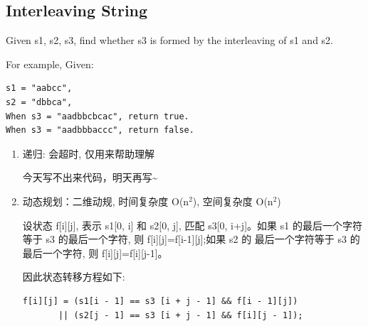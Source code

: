 \documentclass[12pt]{book}
\begin{document}
\subsection{Interleaving String}
\label{sec-14-3-7}
Given s1, s2, s3, find whether s3 is formed by the interleaving of s1 and s2.

For example, Given:
\lstset{language=java,label= ,caption= ,numbers=none}
\begin{lstlisting}
s1 = "aabcc",
s2 = "dbbca",
When s3 = "aadbbcbcac", return true.
When s3 = "aadbbbaccc", return false.
\end{lstlisting}

\begin{enumerate}
\item 递归: 会超时, 仅用来帮助理解
\label{sec-14-3-7-1}

今天写不出来代码，明天再写\textasciitilde{}~

\item 动态规划：二维动规, 时间复杂度 O(n$^{\text{2}}$), 空间复杂度 O(n$^{\text{2}}$)
\label{sec-14-3-7-2}

设状态 f[i][j], 表示 s1[0, i] 和 s2[0, j], 匹配 s3[0,  i+j]。如果 s1
的最后一个字符等于 s3 的最后一个字符, 则 f[i][j]=f[i-1][j];如果 s2 的
最后一个字符等于 s3 的最后一个字符, 则 f[i][j]=f[i][j-1]。

因此状态转移方程如下:
\lstset{language=java,label= ,caption= ,numbers=none}
\begin{lstlisting}
f[i][j] = (s1[i - 1] == s3 [i + j - 1] && f[i - 1][j])
       || (s2[j - 1] == s3 [i + j - 1] && f[i][j - 1]);
\end{lstlisting}


\end{enumerate}
\end{document}
